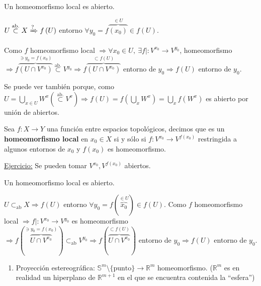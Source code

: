 \begin{prop}
Un homeomorfismo local es abierto.
\end{prop}
\begin{demo}
    $U \stackrel{\text{ab.}}{\subset} X \xRightarrow{?} f\left( U \right)$ entorno $\forall y_0 = f\overbrace{\left( x_0 \right)}^{\in U} \in f\left( U \right)$.

    Como $f$ homeomorfismo local $\Rightarrow \forall x_0 \in U,\ \exists f| : V^{x_0} \rightarrow V^{y_0}$, homeomorfismo $\Rightarrow f\overbrace{\left( U \cap V^{x_0} \right)}^{\ni y_0 = f\left( x_0 \right)} \stackrel{\text{ab.}}{\subset} V^{y_0} \Rightarrow f\overbrace{\left( U \cap V^{x_0} \right)}^{\subset f\left( U \right)}$ entorno de $y_0 \Rightarrow f\left( U \right)$ entorno de $y_0$.

    Se puede ver también porque, como $U = \bigcup_{x \in U} W^x (\stackrel{\text{ab.}}{\subset} V^{x}) \Rightarrow f\left( U \right) = f\left( \bigcup_{x} W^{x} \right) = \bigcup_{x} f\left( W^x \right)$ es abierto por unión de abiertos.
\begin{defi}
Sea $f: X \rightarrow Y$ una función entre espacios topológicos, decimos que es un \textbf{homeomorfismo local} en $x_0 \in X$ si y sólo si $f: V^{x_0} \rightarrow V^{f\left( x_0 \right)}$ restringida a algunos entornos de $x_0$ y $f\left( x_0 \right)$ es homeomorfismo.
\end{defi}

\underline{Ejercicio:} Se pueden tomar $V^{x_0}, V^{f\left( x_0 \right)}$ abiertos.

\begin{obs}
Un homeomorfismo local es abierto.
\end{obs}
\begin{demo}
    $U \subset_{\text{ab}} X \Rightarrow f\left( U \right)$ entorno $\forall y_0 = f\left(\overbrace{x_0}^{\in U}\right) \in f\left( U \right)$.
    Como $f$ homeomorfismo local $\Rightarrow f| : V^{x_0} \rightarrow V^{y_0}$ es homeomorfismo $\Rightarrow f\left( \overbrace{U \cap V^{x_0}}^{\ni y_0 = f\left( x_0 \right)} \right) \subset_{\text{ab}} V^{y_0} \Rightarrow f\left( \overbrace{U \cap V^{x_0}}^{\subset f\left( U \right)} \right)$ entorno de $y_0 \Rightarrow f\left( U \right)$ entorno de $y_0$.
\end{demo}

\begin{ej}[¡Importantes!]
\begin{enumerate}
    \item Proyección estereográfica: $\mathbb{S}^{m} \setminus \{\text{punto}\} \rightarrow \mathbb{R}^m$ homeomorfismo. ($\mathbb{R}^{m}$ es en realidad un hiperplano de $\mathbb{R}^{m+1}$ en el que se encuentra contenida la ``esfera'')


\end{enumerate}
\end{ej}
\end{demo}
